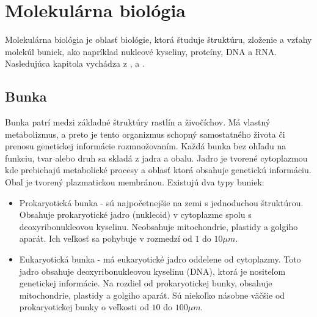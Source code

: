 \chapter{Molekulárna biológia}
\label{biologia}

Molekulárna biológia je oblasť biológie, ktorá študuje štruktúru, zloženie a vzťahy molekúl buniek, ako napríklad nukleové kyseliny, proteíny, DNA a RNA. Nasledujúca kapitola vychádza z \cite{Bio1}, \cite{Bio2} a \cite{Bio3}.

\section{Bunka}
Bunka patrí medzi základné štruktúry rastlín a živočíchov. Má vlastný metabolizmus, a preto je tento organizmus schopný samostatného života či prenosu genetickej informácie rozmnožovaním. Každá bunka bez ohľadu na funkciu, tvar alebo druh sa skladá z jadra a obalu. Jadro je tvorené cytoplazmou kde prebiehajú metabolické procesy a oblasť ktorá obsahuje genetickú informáciu. Obal je tvorený plazmatickou membránou. Existujú dva typy buniek:
\begin{itemize}
\item Prokaryotická bunka - sú najpočetnejšie na zemi s jednoduchou štruktúrou. Obsahuje prokaryotické jadro (nukleoid) v cytoplazme spolu s deoxyribonukleovou kyselinu. Neobsahuje mitochondrie, plastidy a golgiho aparát. Ich veľkosť sa pohybuje v rozmedzí od $1$ do $10 \mu m$.
\item Eukaryotická bunka - má eukaryotické jadro oddelene od cytoplazmy. Toto jadro obsahuje deoxyribonukleovou kyselinu (DNA), ktorá je nositeľom genetickej informácie. Na rozdiel od prokaryotickej bunky, obsahuje mitochondrie, plastidy a golgiho aparát. Sú niekoľko násobne väčšie od prokaryotickej bunky o veľkosti od $10$ do $100 \mu m$.
\end{itemize} 




